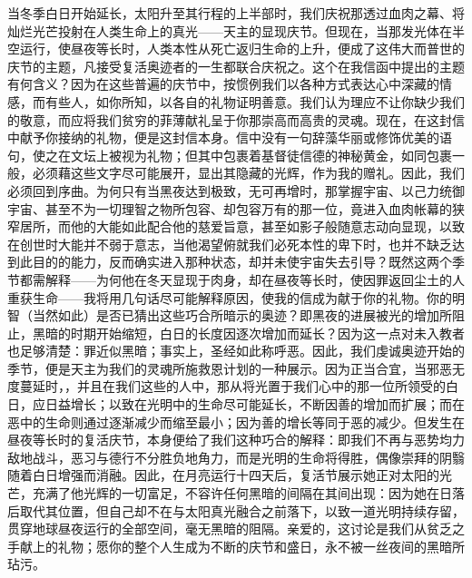 \par

当冬季白日开始延长，太阳升至其行程的上半部时，我们庆祝那透过血肉之幕、将灿烂光芒投射在人类生命上的真光——天主的显现庆节。但现在，当那发光体在半空运行，使昼夜等长时，人类本性从死亡返归生命的上升，便成了这伟大而普世的庆节的主题，凡接受复活奥迹者的一生都联合庆祝之。这个在我信函中提出的主题有何含义？因为在这些普遍的庆节中，按惯例我们以各种方式表达心中深藏的情感，而有些人，如你所知，以各自的礼物证明善意。我们认为理应不让你缺少我们的敬意，而应将我们贫穷的菲薄献礼呈于你那崇高而高贵的灵魂。现在，在这封信中献予你接纳的礼物，便是这封信本身。信中没有一句辞藻华丽或修饰优美的语句，使之在文坛上被视为礼物；但其中包裹着基督徒信德的神秘黄金，如同包裹一般，必须藉这些文字尽可能展开，显出其隐藏的光辉，作为我的赠礼。因此，我们必须回到序曲。为何只有当黑夜达到极致，无可再增时，那掌握宇宙、以己力统御宇宙、甚至不为一切理智之物所包容、却包容万有的那一位，竟进入血肉帐幕的狭窄居所，而他的大能如此配合他的慈爱旨意，甚至如影子般随意志动向显现，以致在创世时大能并不弱于意志，当他渴望俯就我们必死本性的卑下时，也并不缺乏达到此目的的能力，反而确实进入那种状态，却并未使宇宙失去引导？既然这两个季节都需解释——为何他在冬天显现于肉身，却在昼夜等长时，使因罪返回尘土的人重获生命——我将用几句话尽可能解释原因，使我的信成为献于你的礼物。你的明智（当然如此）是否已猜出这些巧合所暗示的奥迹？即黑夜的进展被光的增加所阻止，黑暗的时期开始缩短，白日的长度因逐次增加而延长？因为这一点对未入教者也足够清楚：罪近似黑暗；事实上，圣经如此称呼恶。因此，我们虔诚奥迹开始的季节，便是天主为我们的灵魂所施救恩计划的一种展示。因为正当合宜，当邪恶无度蔓延时，，并且在我们这些的人中，那从将光置于我们心中的那一位所领受的白日，应日益增长；以致在光明中的生命尽可能延长，不断因善的增加而扩展；而在恶中的生命则通过逐渐减少而缩至最小；因为善的增长等同于恶的减少。但发生在昼夜等长时的复活庆节，本身便给了我们这种巧合的解释：即我们不再与恶势均力敌地战斗，恶习与德行不分胜负地角力，而是光明的生命将得胜，偶像崇拜的阴翳随着白日增强而消融。因此，在月亮运行十四天后，复活节展示她正对太阳的光芒，充满了他光辉的一切富足，不容许任何黑暗的间隔在其间出现：因为她在日落后取代其位置，但自己却不在与太阳真光融合之前落下，以致一道光明持续存留，贯穿地球昼夜运行的全部空间，毫无黑暗的阻隔。亲爱的，这讨论是我们从贫乏之手献上的礼物；愿你的整个人生成为不断的庆节和盛日，永不被一丝夜间的黑暗所玷污。\par


